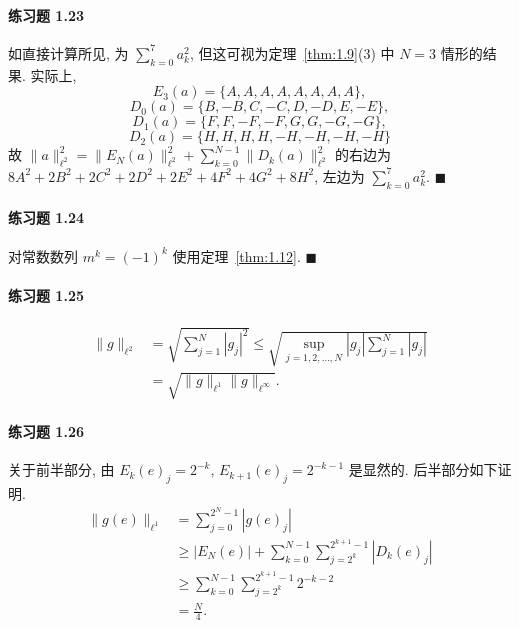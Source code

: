 \paragraph*{练习题 1.23}
如直接计算所见, 为 $\sum_{k=0}^{7}a_{k}^{2}$, 但这可视为定理~\ref{thm:1.9}(3) 中 $N = 3$ 情形的结果. 实际上,
\[
E_{3}(a) = \{A, A, A, A, A, A, A, A\},
\]
\[
D_{0}(a) = \{B, -B, C, -C, D, -D, E, -E\},
\]
\[
D_{1}(a) = \{F, F, -F, -F, G, G, -G, -G\},
\]
\[
D_{2}(a) = \{H, H, H, H, -H, -H, -H, -H\}
\]
故 $\|a\|_{\ell^{2}}^{2} = \|E_{N}(a)\|_{\ell^{2}}^{2}+\sum_{k=0}^{N-1}\|D_{k}(a)\|_{\ell^{2}}^{2}$ 的右边为 $8A^{2}+2B^{2}+2C^{2}+2D^{2}+2E^{2}+4F^{2}+4G^{2}+8H^{2}$, 左边为 $\sum_{k=0}^{7}a_{k}^{2}$. $\blacksquare$

\paragraph*{练习题 1.24}
对常数数列 $m^{k} = (-1)^{k}$ 使用定理~\ref{thm:1.12}. $\blacksquare$

\paragraph*{练习题 1.25}
\begin{align*}
\|g\|_{\ell^{2}} &= \sqrt{\sum_{j=1}^{N}|g_{j}|^{2}} \leq \sqrt{\sup_{j=1,2,\ldots,N}|g_{j}|\sum_{j=1}^{N}|g_{j}|} \\
&= \sqrt{\|g\|_{\ell^{1}}\|g\|_{\ell^{\infty}}}.
\end{align*}

\paragraph*{练习题 1.26}
关于前半部分, 由 $E_{k}(e)_{j} = 2^{-k}$, $E_{k+1}(e)_{j} = 2^{-k-1}$ 是显然的. 后半部分如下证明.
\begin{align*}
\|g(e)\|_{\ell^{1}} &= \sum_{j=0}^{2^{N}-1}|g(e)_{j}| \\
&\geq |E_{N}(e)| + \sum_{k=0}^{N-1}\sum_{j=2^{k}}^{2^{k+1}-1}|D_{k}(e)_{j}| \\
&\geq \sum_{k=0}^{N-1}\sum_{j=2^{k}}^{2^{k+1}-1}2^{-k-2} \\
&= \frac{N}{4}.
\end{align*}

